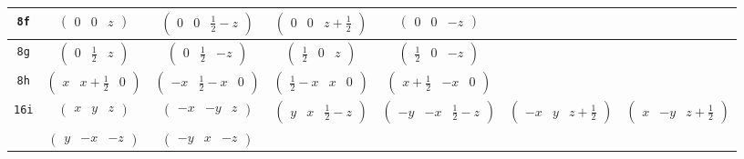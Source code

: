 \documentclass[fleqn,9pt,landscape]{jsarticle}
\begin{document}
\begin{center}
\begin{longtable}{ccccccc}
{\tt 8f} & $ \begin{pmatrix} 0 & 0 & z \end{pmatrix} $ & $ \begin{pmatrix} 0 & 0 & \frac{1}{2} - z \end{pmatrix} $ & $ \begin{pmatrix} 0 & 0 & z + \frac{1}{2} \end{pmatrix} $ & $ \begin{pmatrix} 0 & 0 & - z \end{pmatrix} $ & $  $ & $  $ \\ \hline
{\tt 8g} & $ \begin{pmatrix} 0 & \frac{1}{2} & z \end{pmatrix} $ & $ \begin{pmatrix} 0 & \frac{1}{2} & - z \end{pmatrix} $ & $ \begin{pmatrix} \frac{1}{2} & 0 & z \end{pmatrix} $ & $ \begin{pmatrix} \frac{1}{2} & 0 & - z \end{pmatrix} $ & $  $ & $  $ \\ \hline
{\tt 8h} & $ \begin{pmatrix} x & x + \frac{1}{2} & 0 \end{pmatrix} $ & $ \begin{pmatrix} - x & \frac{1}{2} - x & 0 \end{pmatrix} $ & $ \begin{pmatrix} \frac{1}{2} - x & x & 0 \end{pmatrix} $ & $ \begin{pmatrix} x + \frac{1}{2} & - x & 0 \end{pmatrix} $ & $  $ & $  $ \\ \hline
{\tt 16i} & $ \begin{pmatrix} x & y & z \end{pmatrix} $ & $ \begin{pmatrix} - x & - y & z \end{pmatrix} $ & $ \begin{pmatrix} y & x & \frac{1}{2} - z \end{pmatrix} $ & $ \begin{pmatrix} - y & - x & \frac{1}{2} - z \end{pmatrix} $ & $ \begin{pmatrix} - x & y & z + \frac{1}{2} \end{pmatrix} $ & $ \begin{pmatrix} x & - y & z + \frac{1}{2} \end{pmatrix} $ \\
& $ \begin{pmatrix} y & - x & - z \end{pmatrix} $ & $ \begin{pmatrix} - y & x & - z \end{pmatrix} $ & $  $ & $  $ & $  $ & $  $ \\
\end{longtable}
\end{center}
\end{document}
